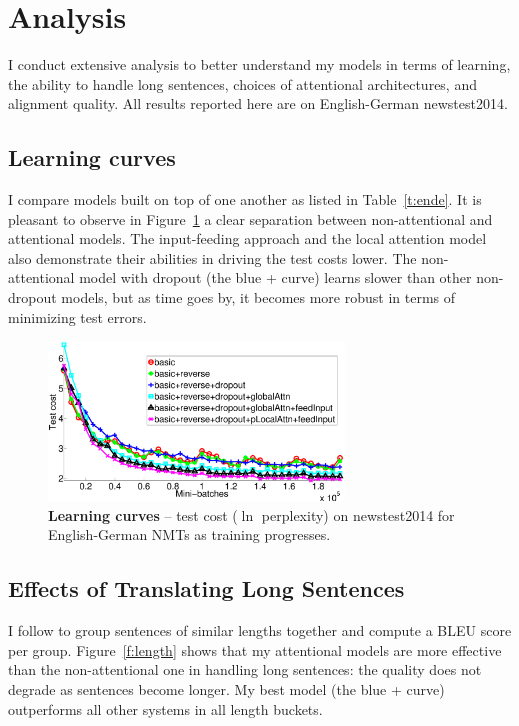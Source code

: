 \section{Analysis}
\label{sec:analysis}
I conduct extensive analysis to better understand my models in terms
of learning, the ability to handle long sentences, 
choices of attentional architectures, and alignment quality. All results
reported here are on English-German newstest2014.

\subsection{Learning curves}
I compare models built on top of one another
as listed in Table~\ref{t:ende}. It is
pleasant to observe in Figure~\ref{f:learn} a clear separation between non-attentional and attentional
models. The input-feeding approach and the local attention
model also demonstrate their abilities in driving the test costs lower. The
non-attentional model with 
dropout (the blue + curve) learns slower than other non-dropout models, but
as time goes by, it becomes more robust in terms of minimizing test errors.
\begin{figure}
\centering
\includegraphics[width=0.7\textwidth, clip=true, trim=140 0 70 0]{img/4-learning} %
\caption[Learning curves]{{\bf Learning curves} -- test cost ($\ln$ perplexity) on newstest2014 for English-German NMTs as training progresses.
} 
\label{f:learn}
\end{figure}

\subsection{Effects of Translating Long Sentences}
I follow \cite{bog15} to group sentences of similar lengths together and
compute a BLEU score per group. Figure~\ref{f:length} shows that
my attentional models are more effective than the non-attentional one in
handling long sentences: the quality does not degrade as sentences
become longer. My best model (the blue + curve) outperforms all other systems in all length buckets.

